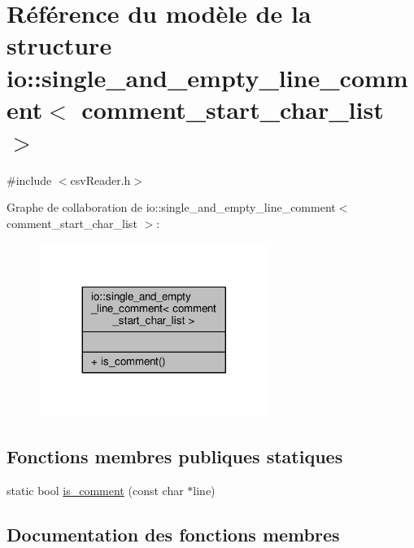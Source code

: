 \hypertarget{structio_1_1single__and__empty__line__comment}{}\section{Référence du modèle de la structure io\+:\+:single\+\_\+and\+\_\+empty\+\_\+line\+\_\+comment$<$ comment\+\_\+start\+\_\+char\+\_\+list $>$}
\label{structio_1_1single__and__empty__line__comment}


{\ttfamily \#include $<$csv\+Reader.\+h$>$}



Graphe de collaboration de io\+:\+:single\+\_\+and\+\_\+empty\+\_\+line\+\_\+comment$<$ comment\+\_\+start\+\_\+char\+\_\+list $>$\+:
\nopagebreak
\begin{figure}[H]
\begin{center}
\leavevmode
\includegraphics[width=212pt]{structio_1_1single__and__empty__line__comment__coll__graph}
\end{center}
\end{figure}
\subsection*{Fonctions membres publiques statiques}
\begin{DoxyCompactItemize}
\item 
static bool \hyperlink{structio_1_1single__and__empty__line__comment_a93a1556dfe4d7e6e3a674d576c4b30f4}{is\+\_\+comment} (const char $\ast$line)
\end{DoxyCompactItemize}


\subsection{Documentation des fonctions membres}
\mbox{\label{structio_1_1single__and__empty__line__comment_a93a1556dfe4d7e6e3a674d576c4b30f4}} 
